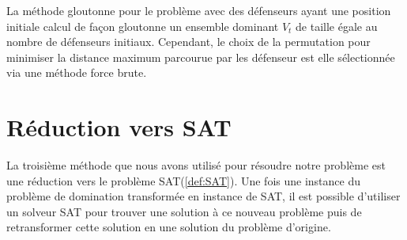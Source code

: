 \bigbreak
La méthode gloutonne pour le problème avec des défenseurs ayant une position initiale calcul de façon gloutonne un ensemble dominant $V_t$ de taille égale au nombre de défenseurs initiaux. Cependant, le choix de la permutation pour minimiser la distance maximum parcourue par les défenseur est elle sélectionnée via une méthode force brute.

\section{Réduction vers SAT}

La troisième méthode que nous avons utilisé pour résoudre notre problème est une réduction vers le problème SAT(\ref{def:SAT}). Une fois une instance du problème de domination transformée en instance de SAT, il est possible d'utiliser un solveur SAT pour trouver une solution à ce nouveau problème puis de retransformer cette solution en une solution du problème d'origine.\newline 

